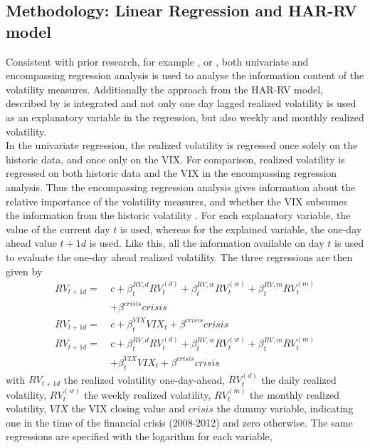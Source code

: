 \subsection{Methodology: Linear Regression and HAR-RV model}\label{sec:42Method}
Consistent with prior research, for example \textcite{jiang2003}, \textcite{canina1993} or \textcite{christensen1998}, both univariate and encompassing regression analysis is used to analyse the information content of the volatility measures. Additionally the approach from the HAR-RV model, described by \textcite{corsi2009} is integrated and not only one day lagged realized volatility is used as an explanatory variable in the regression, but also weekly and monthly realized volatility.\\
In the univariate regression, the realized volatility is regressed once solely on the historic data, and once only on the \ac{VIX}. For comparison, realized volatility is regressed on both historic data and the \ac{VIX} in the encompassing regression analysis. Thus the encompassing regression analysis gives information about the relative importance of the volatility measures, and whether the \ac{VIX} subsumes the information from the historic volatility \parencite{jiang2003}. For each explanatory variable, the value of the current day $t$ is used, whereas for the explained variable, the one-day ahead value $t+1d$ is used. Like this, all the information available on day $t$ is used to evaluate the one-day ahead realized volatility. The three regressions are then given by
\begin{align}
RV_{t+1d} = \ &c + \beta^{RV,d}_{t} RV^{(d)}_{t} + \beta^{RV,w}_{t} RV^{(w)}_{t} + \beta^{RV,m}_{t} RV^{(m)}_{t} \nonumber \\
&+ \beta^{crisis} crisis \tag{Reg1a}  \label{eq:Reg1a}\\[1em]
RV_{t+1d} = \ &c + \beta^{VIX}_{t} VIX_{t} + \beta^{crisis} crisis  \tag{Reg2a}  \label{eq:Reg2a}\\[1em]
RV_{t+1d} = \ &c + \beta^{RV,d}_{t} RV^{(d)}_{t} + \beta^{RV,w}_{t} RV^{(w)}_{t} + \beta^{RV,m}_{t} RV^{(m)}_{t} \nonumber \\
&+ \beta^{VIX}_{t} VIX_{t} + \beta^{crisis} crisis  \tag{Reg3a}  \label{eq:Reg3a}
\end{align}
with $RV_{t+1d}$ the realized volatility one-day-ahead, $RV^{(d)}_{t}$ the daily realized volatility, $RV^{(w)}_{t}$ the weekly realized volatility, $RV^{(m)}_{t}$ the monthly realized volatility, $VIX$ the \ac{VIX} closing value and $crisis$ the dummy variable, indicating one in the time of the financial crisis (2008-2012) and zero otherwise. The same regressions are specified with the logarithm for each variable,
